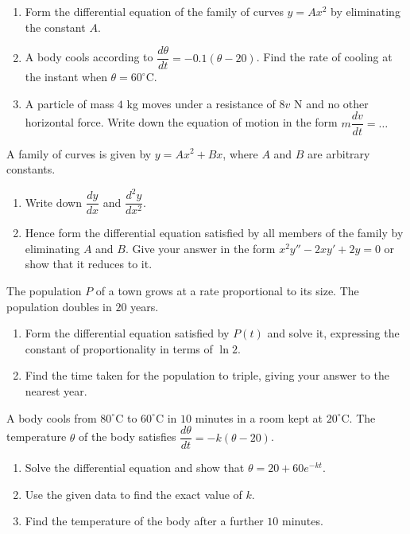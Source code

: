 \documentclass[11pt]{article}
\newcounter{popsec}
\newcounter{popsub}
\newcommand{\courssub}[1]{%
  \stepcounter{popsub}%
  \par\vspace{9pt}\noindent{\popxbold\fontsize{11.5}{13}\selectfont\color{popink}{\color{poporange}\thepopsec.\thepopsub}\hspace{6pt}#1}\par\nopagebreak\vspace{4pt}
}
\begin{document}
\begin{exercice}
\begin{enumerate}
\item Form the differential equation of the family of curves $y = Ax^2$ by eliminating the constant $A$.
\item A body cools according to $\dfrac{d\theta}{dt} = -0.1(\theta - 20)$. Find the rate of cooling at the instant when $\theta = 60^{\circ}$C.
\item A particle of mass $4$ kg moves under a resistance of $8v$ N and no other horizontal force. Write down the equation of motion in the form $m\dfrac{dv}{dt} = \ldots$
\end{enumerate}
\end{exercice}

\courssub{I practise}

\begin{exercice}
A family of curves is given by $y = Ax^2 + Bx$, where $A$ and $B$ are arbitrary constants.

\begin{enumerate}
\item Write down $\dfrac{dy}{dx}$ and $\dfrac{d^2y}{dx^2}$.
\item Hence form the differential equation satisfied by all members of the family by eliminating $A$ and $B$. Give your answer in the form $x^2 y'' - 2xy' + 2y = 0$ or show that it reduces to it.
\end{enumerate}
\end{exercice}

\begin{exercice}
The population $P$ of a town grows at a rate proportional to its size. The population doubles in $20$ years.

\begin{enumerate}
\item Form the differential equation satisfied by $P(t)$ and solve it, expressing the constant of proportionality in terms of $\ln 2$.
\item Find the time taken for the population to triple, giving your answer to the nearest year.
\end{enumerate}
\end{exercice}

\begin{exercice}
A body cools from $80^{\circ}$C to $60^{\circ}$C in $10$ minutes in a room kept at $20^{\circ}$C. The temperature $\theta$ of the body satisfies $\dfrac{d\theta}{dt} = -k(\theta - 20)$.

\begin{enumerate}
\item Solve the differential equation and show that $\theta = 20 + 60e^{-kt}$.
\item Use the given data to find the exact value of $k$.
\item Find the temperature of the body after a further $10$ minutes.
\end{enumerate}
\end{exercice}
\end{document}
